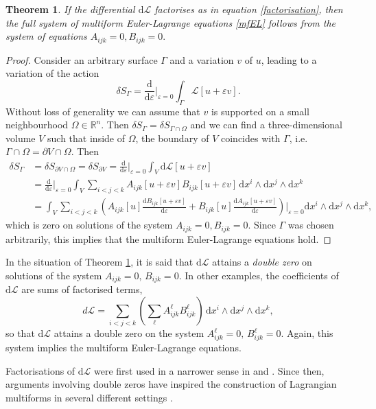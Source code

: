 \documentclass[12pt, a4paper]{article}
\newtheorem{theorem}{Theorem}
\theoremstyle{definition}
\renewcommand{\d}{\mathrm{d}}
\newcommand{\cL}{\mathcal{L}}
\begin{document}
\begin{theorem}
	\label{thm-double-zero}
	If the differential $\d \cL$ factorises as in equation \eqref{factorisation}, then the full system of multiform Euler-Lagrange equations \eqref{mfEL} follows from the system of equations $A_{ijk}=0, B_{ijk}=0.$
\end{theorem}
\begin{proof}
Consider an arbitrary surface $\Gamma$ and a variation $v$ of $u$, leading to a variation of the action
\[ \delta S_\Gamma =  \frac{\d}{\d \varepsilon} \bigg|_{\varepsilon=0} \int_\Gamma \cL[u + \varepsilon v] . \]
Without loss of generality we can assume that $v$ is supported on a small neighbourhood $\Omega \in \mathbb{R}^n$. Then $\delta S_\Gamma = \delta S_{\Gamma \cap \Omega}$ and we can find a three-dimensional volume $V$ such that inside of $\Omega$, the boundary of $V$ coincides with $\Gamma$, i.e.\@ $\Gamma \cap \Omega = \partial V \cap \Omega$. Then
\begin{align*}
	\delta S_\Gamma &= \delta S_{\partial V \cap \Omega} = \delta S_{\partial V} 
	= \frac{\d}{\d \varepsilon} \bigg|_{\varepsilon=0} \int_V \d \cL[u + \varepsilon v] \\
	&= \frac{\d}{\d \varepsilon} \bigg|_{\varepsilon=0} \int_V \sum_{i < j < k} A_{ijk}[u + \varepsilon v]B_{ijk}[u + \varepsilon v] \, \d x^i\wedge \d x^j\wedge \d x^k \\
	&= \int_V \sum_{i < j < k} \left(A_{ijk}[u] \frac{\d B_{ijk}[u + \varepsilon v]}{\d \varepsilon} + B_{ijk}[u] \frac{\d A_{ijk}[u + \varepsilon v]}{\d \varepsilon} \right)\! \bigg|_{\varepsilon=0} \d x^i\wedge \d x^j\wedge \d x^k,
\end{align*}
which is zero on solutions of the system $A_{ijk}=0, B_{ijk}=0$. Since $\Gamma$ was chosen arbitrarily, this implies that the multiform Euler-Lagrange equations hold.
\end{proof}

In the situation of Theorem \ref{thm-double-zero}, it is said that $\d \cL$ attains a \emph{double zero} on solutions of the system $A_{ijk}=0,\, B_{ijk}=0$. In other examples, the coefficients of $\d \cL$ are sums of factorised terms,
\[ d \cL =\sum_{i<j<k} \left( \sum_\ell A_{ijk}^\ell B_{ijk}^\ell \right) \, \d x^i\wedge \d x^j\wedge \d x^k , \]
so that $\d \cL$ attains a double zero on the system $A_{ijk}^\ell = 0,\, B_{ijk}^\ell = 0$. Again, this system implies the multiform Euler-Lagrange equations.

Factorisations of $\d \cL$ were first used in a narrower sense in \cite{petrera2021variational} and \cite{sleigh2020variational}. Since then, arguments involving double zeros have inspired the construction of Lagrangian multiforms in several different settings \cite{sleigh2022semidiscrete, caudrelier2024lagrangian,nijhoff2023lagrangian,richardson2025discrete,richardson2025discretea}.
\end{document}
